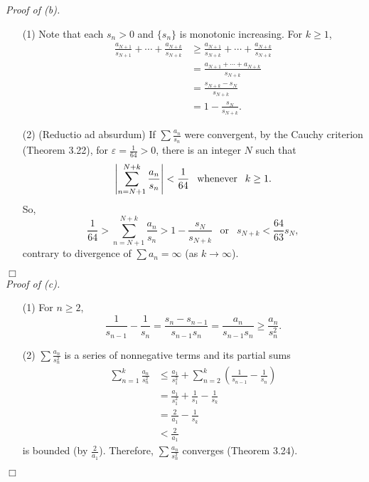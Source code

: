 \documentclass{article}
\begin{document}
\emph{Proof of (b).}
\begin{enumerate}
  \item[(1)]
  Note that each $s_n > 0$ and $\{s_n\}$ is monotonic increasing.
  For $k \geq 1$,
  \begin{align*}
    \frac{a_{N+1}}{s_{N+1}} + \cdots + \frac{a_{N+k}}{s_{N+k}}
    &\geq \frac{a_{N+1}}{s_{N+k}} + \cdots + \frac{a_{N+k}}{s_{N+k}} \\
    &= \frac{a_{N+1} + \cdots + a_{N+k}}{s_{N+k}} \\
    &= \frac{s_{N+k} - s_{N}}{s_{N+k}} \\
    &= 1 - \frac{s_N}{s_{N+k}}.
  \end{align*}
  \item[(2)]
  (Reductio ad absurdum)
  If $\sum \frac{a_n}{s_n}$ were convergent,
  by the Cauchy criterion (Theorem 3.22), for $\varepsilon = \frac{1}{64} > 0$,
  there is an integer $N$ such that
  $$\abs{ \sum_{n=N+1}^{N+k} \frac{a_n}{s_n} } < \frac{1}{64}
  \:\: \text{ whenever } \:\: k \geq 1.$$
  So,
  $$\frac{1}{64} > \sum_{n=N+1}^{N+k} \frac{a_n}{s_n} > 1 - \frac{s_N}{s_{N+k}}
  \:\: \text{ or } \:\:
  s_{N+k} < \frac{64}{63} s_N,$$
  contrary to divergence of $\sum a_n = \infty$ (as $k \to \infty$).
\end{enumerate}
$\Box$ \\



\emph{Proof of (c).}
\begin{enumerate}
  \item[(1)]
  For $n \geq 2$,
  $$\frac{1}{s_{n-1}} - \frac{1}{s_{n}}
  = \frac{s_n-s_{n-1}}{s_{n-1}s_n}
  = \frac{a_n}{s_{n-1}s_n}
  \geq \frac{a_n}{s_n^2}.
  $$
  \item[(2)]
  $\sum \frac{a_n}{s_n^2}$ is a series of nonnegative terms
  and its partial sums
  \begin{align*}
    \sum_{n=1}^{k} \frac{a_n}{s_n^2}
    &\leq \frac{a_1}{s_1^2}
      + \sum_{n=2}^{k}\left( \frac{1}{s_{n-1}} - \frac{1}{s_{n}} \right) \\
    &= \frac{a_1}{s_1^2}
      + \frac{1}{s_{1}} - \frac{1}{s_{k}} \\
    &= \frac{2}{a_1} - \frac{1}{s_{k}} \\
    &< \frac{2}{a_1}
  \end{align*}
  is bounded (by $\frac{2}{a_1}$).
  Therefore, $\sum \frac{a_n}{s_n^2}$ converges (Theorem 3.24).
\end{enumerate}
$\Box$ \\
\end{document}
